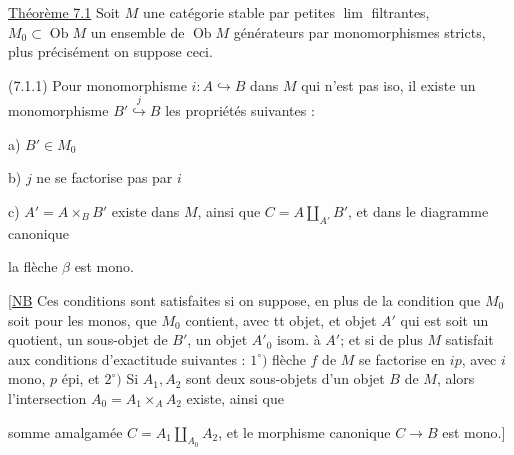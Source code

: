 


\uline{Théorème 7.1} Soit $M$ une catégorie stable par petites \uline{$\lim$} filtrantes,  $M_0\subset\operatorname{Ob}M$ un ensemble de $\operatorname{Ob}M$ générateurs par monomorphismes stricts, plus précisément on suppose  ceci.

(7.1.1) Pour  monomorphisme $i\colon A\hookrightarrow B$ dans $M$ qui n'est pas iso, il existe un monomorphisme $B'\overset{j}{\hookrightarrow}B$  les propriétés suivantes :

a) $B'\in M_0$

b) $j$ ne se factorise pas par $i$

c) $A'=A\times_B B'$ existe dans $M$, ainsi que  $C=A\amalg_{A'}B'$, et  dans le diagramme canonique


la flèche $\beta$ est mono.

[\uline{NB} Ces conditions sont satisfaites si on suppose, en plus de la condition que $M_0$ soit  pour les monos, que $M_0$ contient, avec tt objet, et    objet $A'$ qui est  soit  un quotient,  un sous-objet de $B'$, un objet $A'_0$ isom. à $A'$; et si de plus $M$ satisfait aux conditions d'exactitude suivantes : $1^\circ)$  flèche $f$ de $M$ se factorise en $ip$, avec $i$ mono, $p$ épi, et $2^\circ)$ Si $A_1,A_2$ sont deux sous-objets d'un objet $B$ de $M$, alors l'intersection $A_0=A_1\times_A A_2$ existe, ainsi que 


somme amalgamée $C=A_1\amalg_{A_0} A_2$, et le morphisme canonique $C\longrightarrow B$ est  mono.]  

